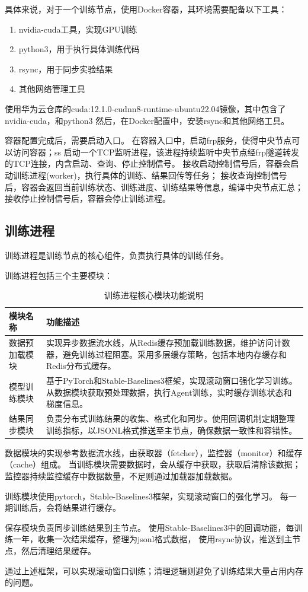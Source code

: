 具体来说，对于一个训练节点，使用Docker容器，其环境需要配备以下工具：
\begin{enumerate}
    \item nvidia-cuda工具，实现GPU训练
    \item python3，用于执行具体训练代码  
    \item rsync，用于同步实验结果
    \item 其他网络管理工具
\end{enumerate}

使用华为云仓库的cuda:12.1.0-cudnn8-runtime-ubuntu22.04镜像，其中包含了nvidia-cuda，和python3  
然后，在Docker配置中，安装rsync和其他网络工具。

容器配置完成后，需要启动入口。
在容器入口中，启动frp服务，使得中央节点可以访问容器；ss
启动一个TCP监听进程，该进程持续监听中央节点经frp隧道转发的TCP连接，内含启动、查询、停止控制信号。  
接收启动控制信号后，容器会启动训练进程(worker)，执行具体的训练、结果回传等任务；
接收查询控制信号后，容器会返回当前训练状态、训练进度、训练结果等信息，编译中央节点汇总；
接收停止控制信号后，容器会停止训练进程。  

\subsection{训练进程}
训练进程是训练节点的核心组件，负责执行具体的训练任务。

训练进程包括三个主要模块：

\begin{table}[H]
    \centering
    \caption{训练进程核心模块功能说明}
    \label{tab:worker-modules-detail}
    \begin{tabular}{@{}>{\raggedright}p{}>{\raggedright\arraybackslash}p{}@{}}
    \toprule
    \textbf{模块名称} & \textbf{功能描述} \\
    \midrule
    数据预加载模块 & 实现异步数据流水线，从Redis缓存预加载训练数据，维护访问计数器，避免训练过程阻塞。采用多层缓存策略，包括本地内存缓存和Redis分布式缓存。 \\
    \midrule
    模型训练模块 & 基于PyTorch和Stable-Baselines3框架，实现滚动窗口强化学习训练。从数据模块获取预处理数据，执行Agent训练，实时缓存训练状态和梯度信息。 \\
    \midrule
    结果同步模块 & 负责分布式训练结果的收集、格式化和同步。使用回调机制定期整理训练指标，以JSONL格式推送至主节点，确保数据一致性和容错性。 \\
    \bottomrule
    \end{tabular}
\end{table}

数据模块的实现参考数据流水线，由获取器（fetcher），监控器（monitor）和缓存（cache）组成。
当训练模块需要数据时，会从缓存中获取，获取后清除该数据；
监控器持续监控缓存中数据数量，不足则通过加载器加载数据。

训练模块使用pytorch，Stable-Baselines3框架，实现滚动窗口的强化学习。
每一期训练后，会将结果进行缓存。

保存模块负责同步训练结果到主节点。
使用Stable-Baselines3中的回调功能，每训练一年，收集一次结果缓存，整理为jsonl格式数据，
使用rsync协议，推送到主节点，然后清理结果缓存。

通过上述框架，可以实现滚动窗口训练；清理逻辑则避免了训练结果大量占用内存的问题。
